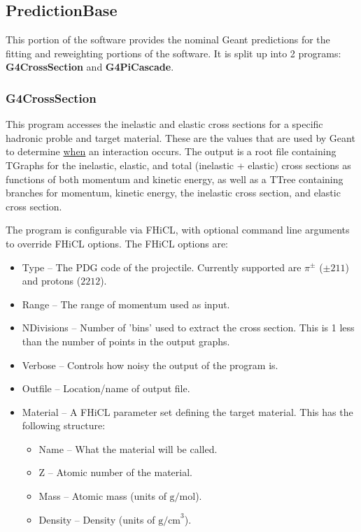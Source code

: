 \documentclass[12pt]{article}
\begin{document}
\subsection{PredictionBase}\label{sub:PredictionBase}
This portion of the software provides the nominal Geant predictions for the fitting and reweighting portions of the software. It is split up into 2 programs: \textbf{G4CrossSection} and \textbf{G4PiCascade}. 
\subsubsection{G4CrossSection}
This program accesses the inelastic and elastic cross sections for a specific hadronic proble and target material. These are the values that are used by Geant to determine \underline{when} an interaction occurs. The output is a root file containing TGraphs for the inelastic, elastic, and total (inelastic + elastic) cross sections as functions of both momentum and kinetic energy, as well as a TTree containing branches for momentum, kinetic energy, the inelastic cross section, and elastic cross section. 

The program is configurable via FHiCL, with optional command line arguments to override FHiCL options. The FHiCL options are:
\begin{itemize}
	\item Type -- The PDG code of the projectile. Currently supported are $\pi^{\pm}$ ($\pm211$) and protons ($2212$).
	\item Range -- The range of momentum used as input. 
	\item NDivisions -- Number of 'bins' used to extract the cross section. This is 1 less than the number of points in the output graphs.
	\item Verbose -- Controls how noisy the output of the program is.
	\item Outfile -- Location/name of output file.
	\item Material -- A FHiCL parameter set defining the target material. This has the following structure:
	\begin{itemize}
		\item Name -- What the material will be called.
		\item Z -- Atomic number of the material.
		\item Mass -- Atomic mass (units of $\textrm{g/mol}$).
		\item Density -- Density (units of $\textrm{g/cm}^3$).
	\end{itemize}
\end{itemize}
\end{document}
